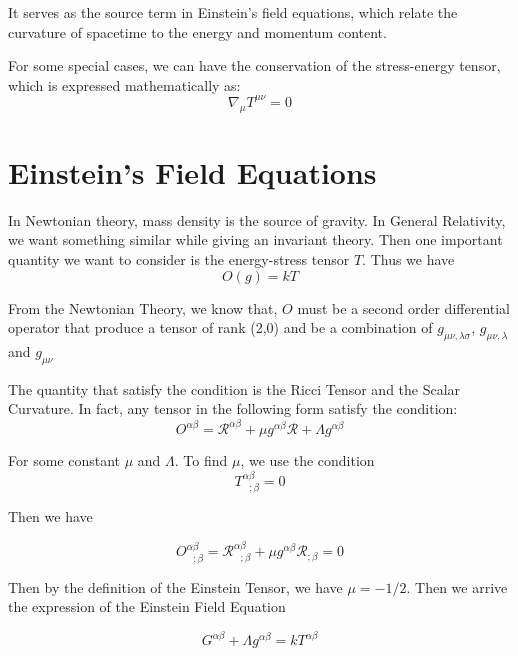 \documentclass{article}
\newcommand{\Ric}{\mathcal{R}}
\begin{document}
It serves as the source term in Einstein's field equations, which relate the curvature of spacetime to the energy and momentum content.

For some special cases, we can have the conservation of the stress-energy tensor, which is expressed mathematically as:
\begin{equation}
\nabla_\mu T^{\mu\nu} = 0
\end{equation}


\section{Einstein's Field Equations}

In Newtonian theory, mass density is the source of gravity. In General Relativity, we want something similar while giving an invariant theory. Then one important quantity we want to consider is the energy-stress tensor $T$. Thus we have
\begin{equation}
    O(g)=kT
\end{equation}

From the Newtonian Theory, we know that, $O$ must be a second order differential operator that produce a tensor of rank (2,0) and be a combination of $g_{\mu\nu,\lambda\sigma}$, $g_{\mu\nu,\lambda}$ and $g_{\mu\nu}$

The quantity that satisfy the condition is the Ricci Tensor and the Scalar Curvature. In fact, any tensor in the following form satisfy the condition:
\begin{equation}
    O^{\alpha\beta}= \Ric^{\alpha\beta}+\mu g^{\alpha\beta}\Ric + \Lambda g^{\alpha\beta}
\end{equation}

For some constant $\mu$ and $\Lambda$. To find $\mu$, we use the condition
\begin{equation}
    \boxed{T^{\alpha\beta}_{~~~;\beta}=0}
\end{equation}

Then we have

\begin{equation}
    O^{\alpha\beta}_{~~~;\beta}=\Ric^{\alpha\beta}_{~~~;\beta}+\mu g^{\alpha\beta}\Ric_{;\beta}=0
\end{equation}

Then by the definition of the Einstein Tensor, we have $\mu=-1/2$. Then we arrive the expression of the Einstein Field Equation

\begin{equation}
    G^{\alpha\beta}+\Lambda g^{\alpha\beta}=kT^{\alpha\beta}
\end{equation}
\end{document}
